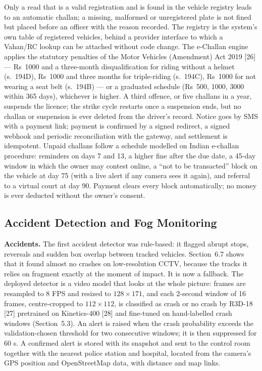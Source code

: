 \documentclass[10pt,a4paper,twocolumn]{article}
\begin{document}
Only a read that is a valid registration and is found in the vehicle registry leads to an automatic challan; a
missing, malformed or unregistered plate is not fined but placed before an officer with the reason recorded. The
registry is the system's own table of registered vehicles, behind a provider interface to which a Vahan/RC lookup can
be attached without code change. The e-Challan engine applies the statutory penalties of the Motor Vehicles
(Amendment) Act 2019 [26] --- Rs~1000 and a three-month disqualification for riding without a helmet (s.~194D), Rs~1000
and three months for triple-riding (s.~194C), Rs~1000 for not wearing a seat belt (s.~194B) --- or a graduated
schedule (Rs~500, 1000, 3000 within 365 days), whichever is higher. A third offence, or five challans in a year,
suspends the licence; the strike cycle restarts once a suspension ends, but no challan or suspension is ever deleted
from the driver's record. Notice goes by SMS with a payment link; payment is confirmed by a signed redirect, a signed
webhook and periodic reconciliation with the gateway, and settlement is idempotent. Unpaid challans follow a schedule
modelled on Indian e-challan procedure: reminders on days 7 and 13, a higher fine after the due date, a 45-day window
in which the owner may contest online, a ``not to be transacted'' block on the vehicle at day 75 (with a live alert if
any camera sees it again), and referral to a virtual court at day 90. Payment clears every block automatically; no money
is ever deducted without the owner's consent.

\subsection{Accident Detection and Fog Monitoring}
\textbf{Accidents.} The first accident detector was rule-based: it flagged abrupt stops, reversals and sudden box
overlap between tracked vehicles. Section~6.7 shows that it found almost no crashes on low-resolution CCTV, because the
tracks it relies on fragment exactly at the moment of impact. It is now a fallback. The deployed detector is a video
model that looks at the whole picture: frames are resampled to 8 FPS and resized to $128\times171$, and each 2-second
window of 16 frames, centre-cropped to $112\times112$, is classified as crash or no crash by R3D-18 [27] pretrained on
Kinetics-400 [28] and fine-tuned on hand-labelled crash windows (Section~5.3). An alert is raised when the crash
probability exceeds the validation-chosen threshold for two consecutive windows; it is then suppressed for 60 s. A
confirmed alert is stored with its snapshot and sent to the control room together with the nearest police station and
hospital, located from the camera's GPS position and OpenStreetMap data, with distance and map links.
\end{document}
